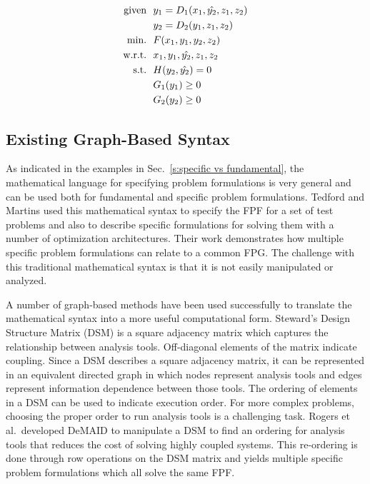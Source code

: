     \begin{align}
        \textrm{given} & \ \ y_1 = D_1(x_1,\hat{y_2},z_1,z_2) \notag
        \\      & \ \ y_2 = D_2(y_1,z_1,z_2) \notag
        \\\textrm{min.} &\ \ F(x_1,y_1,y_2,z_2) \notag
        \\\textrm{w.r.t.} & \ \ x_1,y_1,\hat{y_2},z_1,z_2 \notag
        \\\textrm{s.t.} & \ \ H(y_2,\hat{y_2}) = 0 \notag 
        \\     & \ \ G_1(y_1) \geq 0 \notag
        \\     & \ \ G_2(y_2) \geq 0
        \label{eqn:simple}
    \end{align}


\subsection{Existing Graph-Based Syntax}
	\label{s:existing syntax}
    As indicated in the examples in Sec.~\ref{s:specific vs fundamental}, the mathematical 
    language for specifying problem formulations is very general and can be used both for 
    fundamental and specific problem formulations. Tedford and Martins used this mathematical syntax to specify the 
    FPF for a set of test problems and also to describe specific formulations for solving them with a 
    number of optimization architectures\cite{Tedford2009}. Their work demonstrates how multiple specific 
    problem formulations can relate to a common FPG. The challenge with this 
    traditional mathematical syntax is that it is not easily manipulated or analyzed. 

    A number of graph-based methods have been used successfully to translate the 
    mathematical syntax into a more useful computational form. 
    Steward's Design Structure Matrix (DSM) is a square adjacency matrix which captures the relationship between analysis tools.
    Off-diagonal elements of the matrix indicate coupling\cite{Steward1981}. Since a DSM describes a square adjacency matrix, 
    it can be represented in an equivalent directed graph in which nodes represent analysis tools and 
    edges represent information dependence between those tools. The ordering of elements in a DSM can be used to indicate 
    execution order.  For more complex problems, choosing the proper order to run analysis tools is a challenging task. 
    Rogers et al.~developed DeMAID to manipulate a DSM to find an ordering for analysis tools that 
    reduces the cost of solving highly coupled systems\cite{rogers1996,rogers1996demaid}. This re-ordering is done through 
    row operations on the DSM matrix and yields multiple specific problem 
    formulations which all solve the same FPF. 
    
